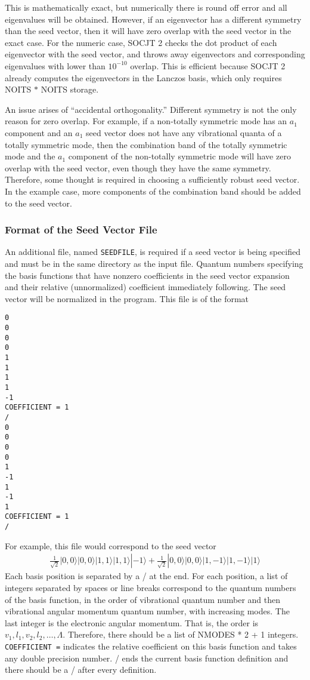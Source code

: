 \documentclass{article}
\begin{document}
This is mathematically exact, but numerically there is round off error and all eigenvalues will be obtained. However, if an eigenvector has a different symmetry than the seed vector, then it will have zero overlap with the seed vector in the exact case. For the numeric case, SOCJT 2 checks the dot product of each eigenvector with the seed vector, and throws away eigenvectors and corresponding eigenvalues with lower than $10^{-10}$ overlap. This is efficient because SOCJT 2 already computes the eigenvectors in the Lanczos basis, which only requires NOITS $*$ NOITS storage.

An issue arises of ``accidental orthogonality.'' Different symmetry is not the only reason for zero overlap. For example, if a non-totally symmetric mode has an $a_1$ component and an $a_1$ seed vector does not have any vibrational quanta of a totally symmetric mode, then the combination band of the totally symmetric mode and the $a_1$ component of the non-totally symmetric mode will have zero overlap with the seed vector, even though they have the same symmetry. Therefore, some thought is required in choosing a sufficiently robust seed vector. In the example case, more components of the combination band should be added to the seed vector.

\subsubsection{Format of the Seed Vector File} \label{seedformat}

An additional file, named {\tt SEEDFILE}, is required if a seed vector is being specified and must be in the same directory as the input file. Quantum numbers specifying the basis functions that have nonzero coefficients in the seed vector expansion and their relative (unnormalized) coefficient immediately following. The seed vector will be normalized in the program. 
This file is of the format 
\begin{verbatim}
0
0
0
0
1
1
1
1
-1
COEFFICIENT = 1
/
0
0
0
0
1
-1
1
-1
1
COEFFICIENT = 1
/
\end{verbatim}
For example, this file would correspond to the seed vector
\begin{align*}
	\frac{1}{\sqrt{2}}|0,0\rangle |0,0\rangle |1,1\rangle |1,1 \rangle |-1\rangle + 
	\frac{1}{\sqrt{2}}|0,0\rangle |0,0\rangle |1,-1\rangle |1,-1 \rangle |1\rangle
\end{align*}
Each basis position is separated by a / at the end. For each position, a list of integers separated by spaces or line breaks correspond to the quantum numbers of the basis function, in the order of vibrational quantum number and then vibrational angular momentum quantum number, with increasing modes. The last integer is the electronic angular momentum. That is, the order is $v_1, l_1, v_2, l_2, \ldots, \Lambda$. Therefore, there should be a list of NMODES * 2 + 1 integers. \texttt{COEFFICIENT =} indicates the relative coefficient on this basis function and takes any double precision number. / ends the current basis function definition and there should be a / after every definition.
\end{document}
